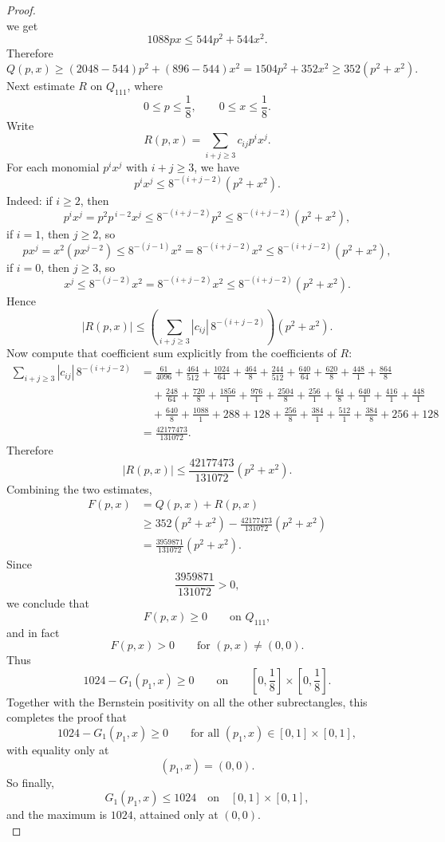 \documentclass[10pt,a4paper]{amsart}
\begin{document}
\begin{proof}
\[\]
we get
\[
1088px\le 544p^2+544x^2.
\]
Therefore
\[
Q(p,x)\ge (2048-544)p^2+(896-544)x^2
=1504p^2+352x^2
\ge 352(p^2+x^2).
\]
Next estimate \(R\) on \(Q_{111}\), where
\[
0\le p\le \frac18,\qquad 0\le x\le \frac18.
\]
Write
\[
R(p,x)=\sum_{i+j\ge 3} c_{ij}p^ix^j.
\]
For each monomial \(p^ix^j\) with \(i+j\ge 3\), we have
\[
p^ix^j\le 8^{-(i+j-2)}(p^2+x^2).
\]
Indeed:
if $i \ge 2$, then
\[
p^ix^j=p^2p^{\,i-2}x^j\le 8^{-(i+j-2)}p^2\le 8^{-(i+j-2)}(p^2+x^2),
\]
if $i=1$, then $j\ge 2$, so
\[
p x^j=x^2(px^{j-2})\le 8^{-(j-1)}x^2=8^{-(i+j-2)}x^2\le 8^{-(i+j-2)}(p^2+x^2),
\]
if $i=0$, then $j\ge 3$, so
\[
x^j\le 8^{-(j-2)}x^2=8^{-(i+j-2)}x^2\le 8^{-(i+j-2)}(p^2+x^2).
\]
Hence
\[
|R(p,x)|
\le
\left(\sum_{i+j\ge 3}|c_{ij}|\,8^{-(i+j-2)}\right)(p^2+x^2).
\]
Now compute that coefficient sum explicitly from the coefficients of \(R\):
\[
\begin{aligned}
	\sum_{i+j\ge 3}|c_{ij}|\,8^{-(i+j-2)}
	&=
	\frac{61}{4096}
	+\frac{464}{512}
	+\frac{1024}{64}
	+\frac{464}{8}
	+\frac{244}{512}
	+\frac{640}{64}
	+\frac{620}{8}
	+\frac{448}{1}
	+\frac{864}{8}
	\\
	&\quad
	+\frac{248}{64}
	+\frac{720}{8}
	+\frac{1856}{1}
	+\frac{976}{1}
	+\frac{2504}{8}
	+\frac{256}{1}
	+\frac{64}{8}
	+\frac{640}{1}
	+\frac{416}{1}
	+\frac{448}{1}
	\\
	&\quad
	+\frac{640}{8}
	+\frac{1088}{1}
	+288
	+128
	+\frac{256}{8}
	+\frac{384}{1}
	+\frac{512}{1}
	+\frac{384}{8}
	+256
	+128
	\\
	&=\frac{42177473}{131072}.
\end{aligned}
\]
Therefore
\[
|R(p,x)|\le \frac{42177473}{131072}(p^2+x^2).
\]
Combining the two estimates,
\[
\begin{aligned}
	F(p,x)
	&=Q(p,x)+R(p,x)\\
	&\ge 352(p^2+x^2)-\frac{42177473}{131072}(p^2+x^2)\\
	&=\frac{3959871}{131072}(p^2+x^2).
\end{aligned}
\]
Since
\[
\frac{3959871}{131072}>0,
\]
we conclude that
\[
F(p,x)\ge 0 \qquad \text{on }Q_{111},
\]
and in fact
\[
F(p,x)>0 \qquad \text{for }(p,x)\neq(0,0).
\]
Thus
\[
1024-G_1(p_1,x)\ge 0
\qquad\text{on}\qquad
\left[0,\frac18\right]\times\left[0,\frac18\right].
\]
Together with the Bernstein positivity on all the other subrectangles, this completes the proof that
\[
1024-G_1(p_1,x)\ge 0
\qquad\text{for all }(p_1,x)\in[0,1]\times[0, 1],
\]
with equality only at
\[
(p_1,x)=(0,0).
\]
So finally,
\[
G_1(p_1,x)\le 1024
\quad\text{on}\quad [0,1]\times[0, 1],
\]
and the maximum is \(1024\), attained only at \((0,0)\).\\[2mm]

\end{proof}
\end{document}
